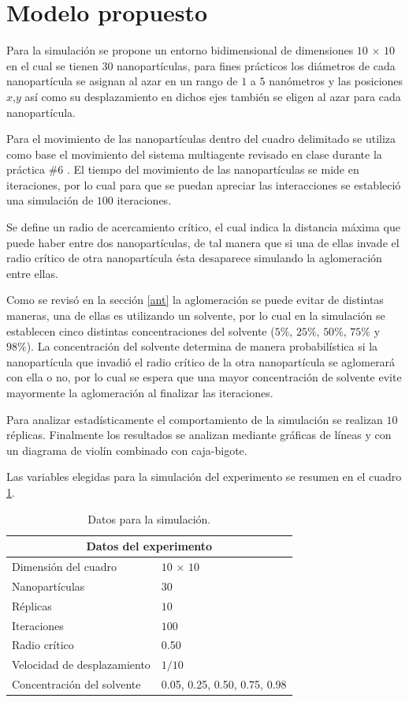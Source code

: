 \documentclass[3p,times,twocolumn]{elsarticle}
\begin{document}
\section{Modelo propuesto}\label{mod}
Para la simulación se propone un entorno bidimensional de dimensiones $10$ $\times$ $10$ en el cual se tienen $30$ nanopartículas, para fines prácticos los diámetros de cada nanopartícula se asignan al azar en un rango de $1$ a $5$ nanómetros y las posiciones $x$,$y$ así como su desplazamiento en dichos ejes también se eligen al azar para cada nanopartícula.

Para el movimiento de las nanopartículas dentro del cuadro delimitado se utiliza como base el movimiento del sistema multiagente revisado en clase durante la práctica \#6 \cite{6}. El tiempo del movimiento de las nanopartículas se mide en iteraciones, por lo cual para que se puedan apreciar las interacciones se estableció una simulación de $100$ iteraciones.

Se define un radio de acercamiento crítico, el cual indica la distancia máxima que puede haber entre dos nanopartículas, de tal manera que si una de ellas invade el radio crítico de otra nanopartícula ésta desaparece simulando la aglomeración entre ellas. 

Como se revisó en la sección \ref{ant} la aglomeración se puede evitar de distintas maneras, una de ellas es utilizando un solvente, por lo cual en la simulación se establecen cinco distintas concentraciones del solvente ($5\%$, $25\%$, $50\%$, $75\%$ y $98\%$). La concentración del solvente determina de manera probabilística si la nanopartícula que invadió el radio crítico de la otra nanopartícula se aglomerará con ella o no, por lo cual se espera que una mayor concentración de solvente evite mayormente la aglomeración al finalizar las iteraciones.

Para analizar estadísticamente el comportamiento de la simulación se realizan $10$ réplicas. Finalmente los resultados se analizan mediante gráficas de líneas y con un diagrama de violín combinado con caja-bigote. 

Las variables elegidas para la simulación del experimento se resumen en el cuadro \ref{Cuadro 1}.

\begin{table}[ht]
\centering
\begin{tabular}{ |p{4.2cm}||p{2.8cm}|}
 \hline
 \multicolumn{2}{|c|}{Datos del experimento} \\
 \hline
 Dimensión del cuadro & $10$ $\times$ $10$ \\
 \hline
 Nanopartículas    & $30$ \\
 \hline
 Réplicas    & $10$ \\
 \hline
 Iteraciones & $100$ \\
 \hline
  Radio crítico & 0.50 \\
 \hline
  Velocidad de desplazamiento& $1/10$ \\
 \hline
 Concentración del solvente & 0.05, 0.25, 0.50, 0.75, 0.98 \\
 \hline
\end{tabular}
\caption{Datos para la simulación.}
\label{Cuadro 1}
\end{table}
\end{document}
